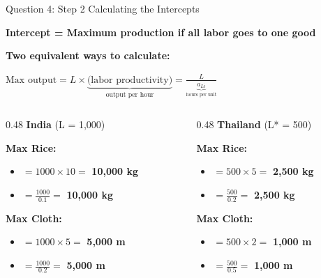 \documentclass{beamer}
\begin{document}

\begin{frame}{Question 4: Step 2 Calculating the Intercepts}

\textbf{Intercept = Maximum production if all labor goes to one good}

\vspace{0.2cm}

\textbf{Two equivalent ways to calculate:}

\vspace{-0.1cm}

\begin{center}
\small
$\text{Max output} = L \times \underbrace{\text{(labor productivity)}}_{\text{output per hour}} = \frac{L}{\underbrace{a_{Li}}_{\text{hours per unit}}}$
\end{center}

\vspace{0.3cm}

\begin{columns}[T]
\begin{column}{0.48\textwidth}
\textcolor{homecolor}{\textbf{India}} (L = 1,000)

\small
\textbf{Max Rice:}
\begin{itemize}
    \item $= 1000 \times 10 = $ \textbf{10,000 kg}
    \item $= \frac{1000}{0.1} = $ \textbf{10,000 kg}
\end{itemize}

\textbf{Max Cloth:}
\begin{itemize}
    \item $= 1000 \times 5 = $ \textbf{5,000 m}
    \item $= \frac{1000}{0.2} = $ \textbf{5,000 m}
\end{itemize}
\end{column}

\begin{column}{0.48\textwidth}
\textcolor{foreigncolor}{\textbf{Thailand}} (L* = 500)

\small
\textbf{Max Rice:}
\begin{itemize}
    \item $= 500 \times 5 = $ \textbf{2,500 kg}
    \item $= \frac{500}{0.2} = $ \textbf{2,500 kg}
\end{itemize}

\textbf{Max Cloth:}
\begin{itemize}
    \item $= 500 \times 2 = $ \textbf{1,000 m}
    \item $= \frac{500}{0.5} = $ \textbf{1,000 m}
\end{itemize}
\end{column}
\end{columns}

\end{frame}
\end{document}

